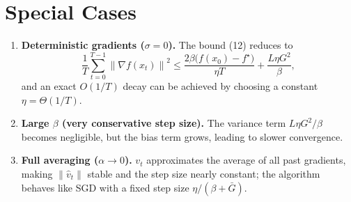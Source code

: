 \documentclass{article}
\newcommand{\norm}[1]{\left\lVert#1\right\rVert}
\begin{document}
\section*{Special Cases}
\begin{enumerate}
    \item \textbf{Deterministic gradients ($\sigma=0$).} The bound (12) reduces to
    \[
    \frac{1}{T}\sum_{t=0}^{T-1}\norm{\nabla f(x_t)}^2
    \le \frac{2\beta\bigl(f(x_0)-f^\star\bigr)}{\eta T}
    +\frac{L\eta G^2}{\beta},
    \]
    and an exact $O(1/T)$ decay can be achieved by choosing a constant $\eta = \Theta(1/T)$.
    \item \textbf{Large $\beta$ (very conservative step size).} The variance term $L\eta G^2/\beta$ becomes negligible, but the bias term grows, leading to slower convergence.
    \item \textbf{Full averaging ($\alpha\to0$).} $v_t$ approximates the average of all past gradients, making $\norm{\hat v_t}$ stable and the step size nearly constant; the algorithm behaves like SGD with a fixed step size $\eta/(\beta+\bar G)$.
\end{enumerate}
\end{document}
